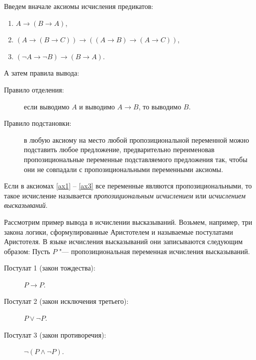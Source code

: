 \documentclass[b5paper,11pt]{book}
\begin{document}
	Введем вначале аксиомы исчисления предикатов:
	\begin{enumerate}
		\item\label{ax1} $A\rightarrow (B\rightarrow A)$,
		\item\label{ax2} $(A\rightarrow (B\rightarrow C))\rightarrow ((A\rightarrow B)\rightarrow(A\rightarrow C))$,
		\item\label{ax3} $(\neg A\rightarrow \neg B)\rightarrow(B\rightarrow A)$.
	\end{enumerate}  
	А затем правила вывода:
	\begin{description}
		\item[Правило отделения:] если выводимо $A$ и выводимо $A\rightarrow B$, то выводимо $B$.
		\item[Правило подстановки:] в любую аксиому на место любой пропозициональной переменной можно подставить любое предложение, предварительно переименовав пропозициональные переменные подставляемого предложения так, чтобы они не совпадали с пропозициональными переменными аксиомы.
	\end{description}
	
	Если в аксиомах \ref{ax1} -- \ref{ax3} все переменные являются пропозициональными, то такое исчисление называется \textit{пропозициональным исчислением} или \textit{исчислением высказываний}.
	
	Рассмотрим пример вывода в исчислении высказываний. Возьмем, например, три закона логики, сформулированные Аристотелем и называемые постулатами Аристотеля. В языке исчисления высказываний они записываются следующим образом: 
	Пусть $P$ "--- пропозициональная переменная исчисления высказываний.
	\begin{description}
		\item[Постулат 1 (закон тождества):] $P\rightarrow P$.
		\item[Постулат 2 (закон исключения третьего):] $P\vee\neg P$.
		\item[Постулат 3 (закон противоречия):] $\neg(P\wedge\neg P)$.
	\end{description}
	
\end{document}
